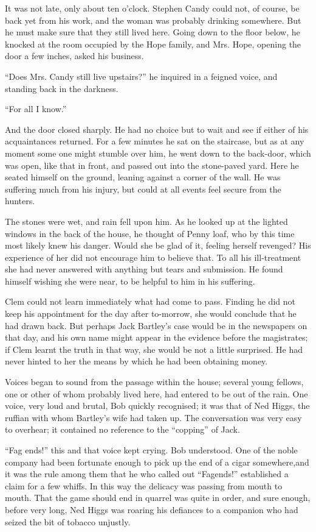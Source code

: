It was not late, only about ten o'clock. Stephen Candy could not, of
course, be back yet from his work, and the woman was probably drinking
somewhere. But he must make sure that they still lived here. Going down
to the floor below, he knocked at the room occupied by the Hope family,
and Mrs. Hope, opening the door a few inches, asked his business.

``Does Mrs. Candy still live upstairs?'' he inquired in a feigned voice,
and standing back in the darkness.

{}``For all I know.''

And the door closed sharply. He had no choice but to wait and see if
either of his acquaintances returned. For a few minutes he sat on the
staircase, but as at any moment some one might stumble over him, he went
down to the back-door, which was open, like that in front, and passed
out into the stone-paved yard. Here he seated himself on the ground,
leaning against a corner of the wall. He was suffering much from his
injury, but could at all events feel secure from the hunters.

The stones were wet, and rain fell upon him. As he looked up at the
lighted windows in the back of the house, he thought of Penny loaf, who
by this time most likely knew his danger. Would she be glad of it,
feeling herself revenged? His experience of her did not encourage him to
believe that. To all his ill-treatment she had never answered with
anything but tears and submission. He found himself wishing she were
near, to be helpful to him in his suffering.

Clem could not learn immediately what had come to pass. Finding he did
not keep his {}appointment for the day after to-morrow, she would
conclude that he had drawn back. But perhaps Jack Bartley's case would
be in the newspapers on that day, and his own name might appear in the
evidence before the magistrates; if Clem learnt the truth in that way,
she would be not a little surprised. He had never hinted to her the
means by which he had been obtaining money.

Voices began to sound from the passage within the house; several young
fellows, one or other of whom probably lived here, had entered to be out
of the rain. One voice, very loud and brutal, Bob quickly recognised; it
was that of Ned Higgs, the ruffian with whom Bartley's wife had taken
up. The conversation was very easy to overhear; it contained no
reference to the ``copping'' of Jack.

``Fag ends!'' this and that voice kept crying. Bob understood. One of
the noble company had been fortunate enough to pick up the end of a
cigar somewhere,and it was the rule among them that he who called out
``Fagends!'' established a claim for a few whiffs. In this way the
delicacy was passing from mouth to mouth. That the game should end {}in
quarrel was quite in order, and sure enough, before very long, Ned Higgs
was roaring his defiances to a companion who had seized the bit of
tobacco unjustly.

